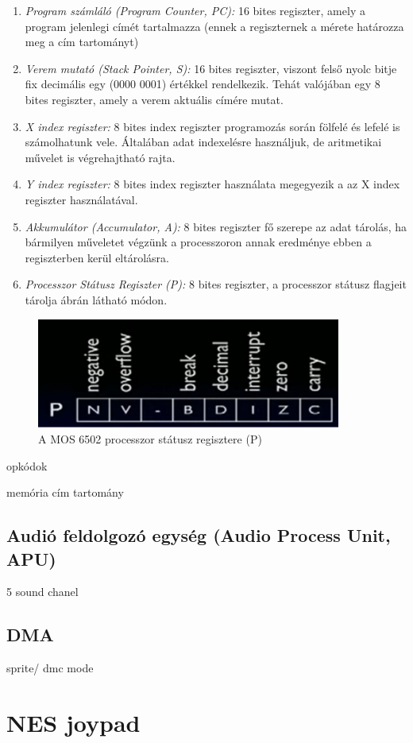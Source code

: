	\begin{enumerate}
		\item \emph{Program számláló (Program Counter, PC):} 16 bites regiszter, amely a program jelenlegi címét tartalmazza (ennek a regiszternek a mérete határozza meg a cím tartományt)
		\item \emph{Verem mutató (Stack Pointer, S):} 16 bites regiszter, viszont felső nyolc bitje fix decimális egy (0000 0001) értékkel rendelkezik. Tehát valójában egy 8 bites regiszter, amely a verem aktuális címére mutat. 
		\item \emph{X index regiszter:} 8 bites index regiszter programozás során fölfelé és lefelé is számolhatunk vele. Általában adat indexelésre használjuk, de aritmetikai művelet is végrehajtható rajta.
		\item\emph{Y index regiszter:} 8 bites index regiszter használata megegyezik a az X index regiszter használatával. 
		\item \emph{Akkumulátor (Accumulator, A):} 8 bites regiszter fő szerepe az adat tárolás, ha bármilyen műveletet végzünk a processzoron annak eredménye ebben a regiszterben kerül eltárolásra.
		\item \emph{Processzor Státusz Regiszter (P):} 8 bites regiszter, a processzor státusz flagjeit tárolja  ábrán látható módon.	
	\end{enumerate} 
	
	\begin{figure}[H]
		\centering
		\includegraphics[width=100mm, keepaspectratio]{figures/6502-P-reg}
		\caption{A MOS 6502 processzor státusz regisztere (P)}
		\label{fig:6502-P-reg}
	\end{figure} 
	
	opkódok
	
	memória cím tartomány

	\subsection{Audió feldolgozó egység (Audio Process Unit, APU)}
	
	5 sound chanel

	\subsection{DMA}
	
	sprite/ dmc mode

\section{NES joypad}
